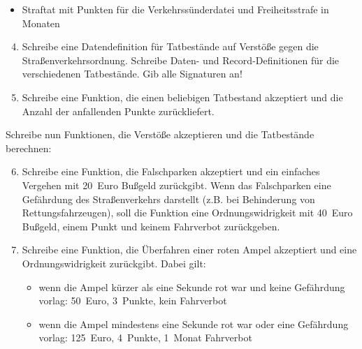 \begin{aufgabe}
\begin{itemize}
  \item Straftat mit Punkten für die Verkehrssünderdatei und
    Freiheitsstrafe in Monaten
  \end{itemize}
  
  \begin{enumerate} \setcounter{enumii}{3}
  \item Schreibe eine Datendefinition für
    Tatbestände auf Verstöße gegen die Straßenverkehrsordnung.
    Schreibe Daten- und Record-Definitionen für die verschiedenen
    Tatbestände.  Gib alle Signaturen an!

  \item Schreibe eine Funktion, die einen
    beliebigen Tatbestand akzeptiert und die Anzahl der anfallenden
    Punkte zurückliefert.
  \end{enumerate}

  Schreibe nun Funktionen, die Verstöße akzeptieren und die
  Tatbestände berechnen:

  \begin{enumerate} \setcounter{enumii}{5}
  \item Schreibe eine Funktion, die Falschparken
    akzeptiert und ein einfaches Vergehen mit 20~Euro Bußgeld zurückgibt.
    Wenn das Falschparken eine Gefährdung des Straßenverkehrs
    darstellt (z.B.  bei Behinderung von Rettungsfahrzeugen),
    soll die Funktion eine Ordnungswidrigkeit mit 40~Euro Bußgeld,
    einem Punkt und keinem Fahrverbot zurückgeben.

  \item Schreibe eine Funktion, die Überfahren
    einer roten Ampel akzeptiert und eine Ordnungswidrigkeit
    zurückgibt.  Dabei gilt:
    \begin{itemize}
    \item wenn die Ampel kürzer als eine Sekunde rot war und keine
      Gefährdung vorlag: 50~Euro, 3~Punkte, kein Fahrverbot
    \item wenn die Ampel mindestens eine Sekunde rot war oder eine
      Gefährdung vorlag: 125~Euro, 4~Punkte, 1~Monat Fahrverbot
    \end{itemize}


\end{enumerate}
\end{aufgabe}
